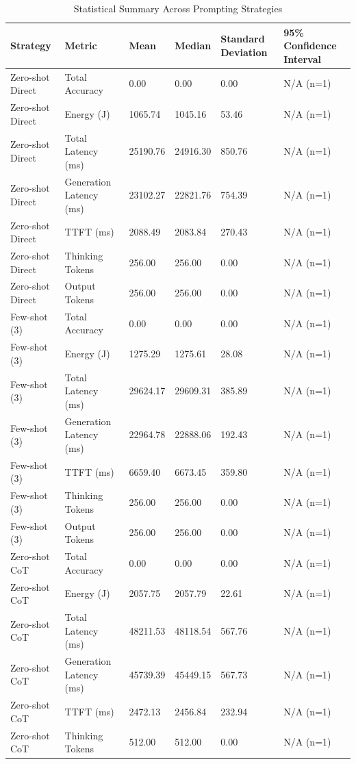 \begin{table}
\caption{Statistical Summary Across Prompting Strategies}
\label{tab:statistical_summary}
\begin{tabular}{llllll}
\toprule
Strategy & Metric & Mean & Median & Standard Deviation & 95\% Confidence Interval \\
\midrule
Zero-shot Direct & Total Accuracy & 0.00 & 0.00 & 0.00 & N/A (n=1) \\
Zero-shot Direct & Energy (J) & 1065.74 & 1045.16 & 53.46 & N/A (n=1) \\
Zero-shot Direct & Total Latency (ms) & 25190.76 & 24916.30 & 850.76 & N/A (n=1) \\
Zero-shot Direct & Generation Latency (ms) & 23102.27 & 22821.76 & 754.39 & N/A (n=1) \\
Zero-shot Direct & TTFT (ms) & 2088.49 & 2083.84 & 270.43 & N/A (n=1) \\
Zero-shot Direct & Thinking Tokens & 256.00 & 256.00 & 0.00 & N/A (n=1) \\
Zero-shot Direct & Output Tokens & 256.00 & 256.00 & 0.00 & N/A (n=1) \\
Few-shot (3) & Total Accuracy & 0.00 & 0.00 & 0.00 & N/A (n=1) \\
Few-shot (3) & Energy (J) & 1275.29 & 1275.61 & 28.08 & N/A (n=1) \\
Few-shot (3) & Total Latency (ms) & 29624.17 & 29609.31 & 385.89 & N/A (n=1) \\
Few-shot (3) & Generation Latency (ms) & 22964.78 & 22888.06 & 192.43 & N/A (n=1) \\
Few-shot (3) & TTFT (ms) & 6659.40 & 6673.45 & 359.80 & N/A (n=1) \\
Few-shot (3) & Thinking Tokens & 256.00 & 256.00 & 0.00 & N/A (n=1) \\
Few-shot (3) & Output Tokens & 256.00 & 256.00 & 0.00 & N/A (n=1) \\
Zero-shot CoT & Total Accuracy & 0.00 & 0.00 & 0.00 & N/A (n=1) \\
Zero-shot CoT & Energy (J) & 2057.75 & 2057.79 & 22.61 & N/A (n=1) \\
Zero-shot CoT & Total Latency (ms) & 48211.53 & 48118.54 & 567.76 & N/A (n=1) \\
Zero-shot CoT & Generation Latency (ms) & 45739.39 & 45449.15 & 567.73 & N/A (n=1) \\
Zero-shot CoT & TTFT (ms) & 2472.13 & 2456.84 & 232.94 & N/A (n=1) \\
Zero-shot CoT & Thinking Tokens & 512.00 & 512.00 & 0.00 & N/A (n=1) \\

\end{tabular}
\end{table}
